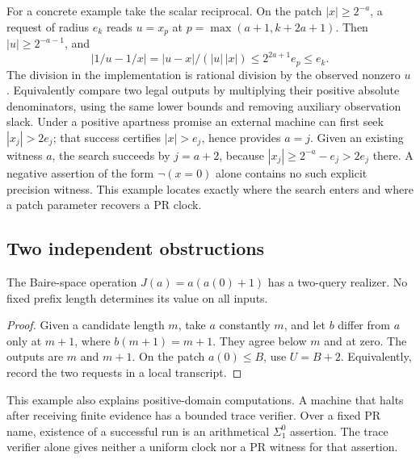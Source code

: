 For a concrete example take the scalar reciprocal. On the patch
$|x|\ge 2^{-a}$, a request of radius $e_k$ reads $u=x_p$ at
$p=\max(a+1,k+2a+1)$. Then $|u|\ge 2^{-a-1}$, and
\[
       |1/u-1/x|=|u-x|/(|u|\,|x|)\le 2^{2a+1}e_p\le e_k .
\]
The division in the implementation is rational division by the observed
nonzero $u$. Equivalently compare two legal outputs by multiplying their
positive absolute denominators, using the same lower bounds and removing
auxiliary observation slack. Under a positive apartness promise an external
machine can first seek $|x_j|>2e_j$; that success certifies
$|x|>e_j$, hence provides $a=j$. Given an existing witness $a$, the search
succeeds by $j=a+2$, because $|x_j|\ge2^{-a}-e_j>2e_j$ there.
A negative assertion of the form $\neg(x=0)$ alone contains no such explicit
precision witness. This example locates exactly where the search enters and
where a patch parameter recovers a PR clock.

\subsection{Two independent obstructions}

\begin{proposition}
The Baire-space operation $J(a)=a(a(0)+1)$ has a two-query realizer. No
fixed prefix length determines its value on all inputs.
\end{proposition}
\begin{proof}
Given a candidate length $m$, take $a$ constantly $m$, and let $b$ differ
from $a$ only at $m+1$, where $b(m+1)=m+1$. They agree below $m$ and at
zero. The outputs are $m$ and $m+1$. On the patch $a(0)\le B$, use
$U=B+2$. Equivalently, record the two requests in a local transcript.
\end{proof}
This example also explains positive-domain computations. A machine that
halts after receiving finite evidence has a bounded trace verifier. Over
a fixed PR name, existence of a successful run is an arithmetical
$\Sigma^0_1$ assertion. The trace verifier alone gives neither a uniform
clock nor a PR witness for that assertion.

